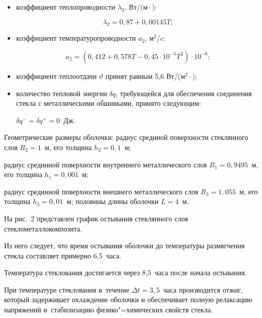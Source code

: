 \begin{itemize}

\item[--] коэффициент теплопроводности $\lambda _2$, Вт/(м${}\cdot{}$\textcelsius):

\[

\lambda _2 =0,87+0,00145 T;

\]



\item[--] коэффициент температуропроводности $a_2$, м$^2$/c:

\[

a_2 =(0,412+0,578T-0,45\cdot 10^{-5}T^2)\cdot 10^{-6};

\]



\item[--]  коэффициент теплоотдачи $\vartheta$ принят равным 5,6 Вт/(м$^2{}\cdot{}$\textcelsius);



\item[--] количество тепловой энергии $\delta q$, требующейся для обеспечения соединения стекла с металлическими обшивками, принято следующим:

$\delta q^{-} = \delta q^{+}=0$~Дж.



\end{itemize}



Геометрические размеры оболочки: радиус срединой поверхности стеклянного слоя $R_{2}=1$~м, его толщина $h_{2}=0,1$~м; 

радиус срединной поверхности внутреннего металлического слоя $R_{1}=0,9495$~м, его толщина $h_{1}=0,001$~м; 

радиус срединной поверхности внешнего металлического слоя $R_{3}=1,055$~м, его толщина $h_{3}=0,01$~м; половины длины оболочки $L=4$~м.



На рис.~2 представлен график остывания стеклянного слоя стеклометаллокомпозита. 

Из него следует, что время остывания оболочки до температуры размягчения стекла составляет примерно 6,5~часа. 

Температура стеклования достигается через 8,5~часа после начала остывания. 

При температуре стеклования в~течение $\Delta t=3,5$~часа производится отжиг,  который задерживает охлаждение оболочки и  обеспечивает полную релаксацию напряжений и~стабилизацию физико"=химических свойств стекла. 


